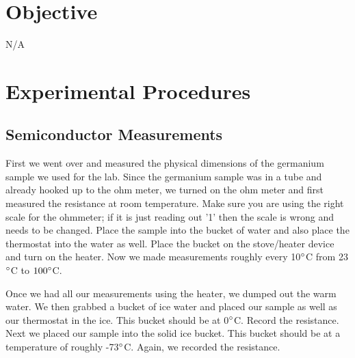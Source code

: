 \documentclass{article}
\begin{document}



\section{Objective}

N/A
\section{Experimental Procedures}
\subsection{Semiconductor Measurements}
First we went over and measured the physical dimensions of the germanium sample we used for the lab. Since the germanium sample was in a tube and already hooked up to the ohm meter, we turned on the ohm meter and first measured the resistance at room temperature. Make sure you are using the right scale for the ohmmeter; if it is just reading out '1' then the scale is wrong and needs to be changed. Place the sample into the bucket of water and also place the thermostat into the water as well. Place the bucket on the stove/heater device and turn on the heater. Now we made measurements roughly every 10$\degree$C from 23$\degree$C to $100\degree$C.

Once we had all our measurements using the heater, we dumped out the warm water. We then grabbed a bucket of ice water and placed our sample as well as our thermostat in the ice. This bucket should be at 0$\degree$C. Record the resistance. Next we placed our sample into the solid ice bucket. This bucket should be at a temperature of roughly -73$\degree$C. Again, we recorded the resistance.
\end{document}
